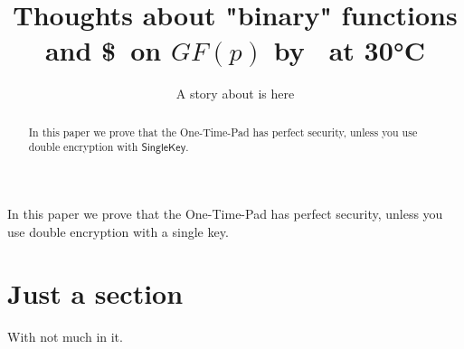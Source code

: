 \documentclass[journal=tches]{iacrj}
\title[running={Thoughts on binary functions},
  plaintext={Thoughts about "binary" functions and \$\ on $GF(p)$ by Fester Bestertester at 30°C}]{%
  Thoughts about "binary" functions and \$\ on $GF(p)$ by \niceguy\ at 30°C}
\subtitle{A story about \niceguy is here}
\begin{document}
\maketitle

\begin{abstract}
  In this paper we prove that the One-Time-Pad has perfect security, unless you use
  double encryption with {$\mathsf{SingleKey}$}.

\end{abstract}
\begin{textabstract}
In this paper we prove that the One-Time-Pad has perfect security, unless you use
double encryption with a single key.
\end{textabstract}
\section{Just a section}
With not much in it.
\end{document}
